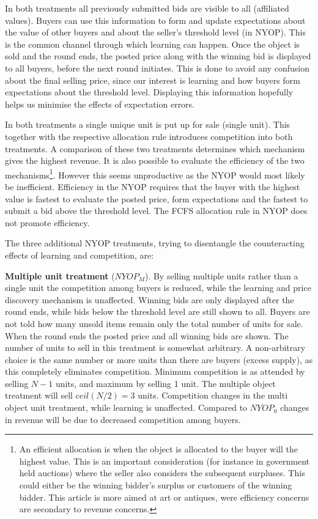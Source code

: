 \documentclass[a4paper,12pt]{article}
\begin{document}
	In both treatments all previously submitted bids are visible to all (affiliated values). Buyers can use this information to form and update expectations about the value of other buyers and about the seller's threshold level (in NYOP). This is the common channel through which learning can happen. Once the object is sold and the round ends, the posted price along with the winning bid is displayed to all buyers, before the next round initiates. This is done to avoid any confusion about the final selling price, since our interest is learning and how buyers form expectations about the threshold level. Displaying this information hopefully helps us minimise the effects of expectation errors.

	In both treatments a single unique unit is put up for sale (single unit). This together with the respective allocation rule introduces competition into both treatments. A comparison of these two treatments determines which mechanism gives the highest revenue. It is also possible to evaluate the efficiency of the two mechanisms\footnote{\label{footnote:efficient}An efficient allocation is when the object is allocated to the buyer will the highest value. This is an important consideration (for instance in government held auctions) where the seller also considers the subsequent surpluses. This could either be the winning bidder's surplus or customers of the winning bidder. This article is more aimed at art or antiques, were efficiency concerns are secondary to revenue concerns.}. However this seems unproductive as the NYOP would most likely be inefficient. Efficiency in the NYOP requires that the buyer with the highest value is fastest to evaluate the posted price, form expectations and the fastest to submit a bid above the threshold level. The FCFS allocation rule in NYOP does not promote efficiency. 

	The three additional NYOP treatments, trying to disentangle the counteracting effects of learning and competition, are:

	{\bf Multiple unit treatment} ($NYOP_M$). 
	By selling multiple units rather than a single unit the competition among buyers is reduced, while the learning and price discovery mechanism is unaffected. Winning bids are only displayed after the round ends, while bids below the threshold level are still shown to all. Buyers are not told how many unsold items remain only the total number of units for sale. When the round ends the posted price and all winning bids are shown. The number of units to sell in this treatment is somewhat arbitrary. A non-arbitrary choice is the same number or more units than there are buyers (excess supply), as this completely eliminates competition. Minimum competition is as attended by selling $N-1$ units, and maximum by selling 1 unit. The multiple object treatment will sell $ceil(N/2)=3$ units. Competition changes in the multi object unit treatment, while learning is unaffected. Compared to $NYOP_0$ changes in revenue will be due to decreased competition among buyers.
\end{document}
